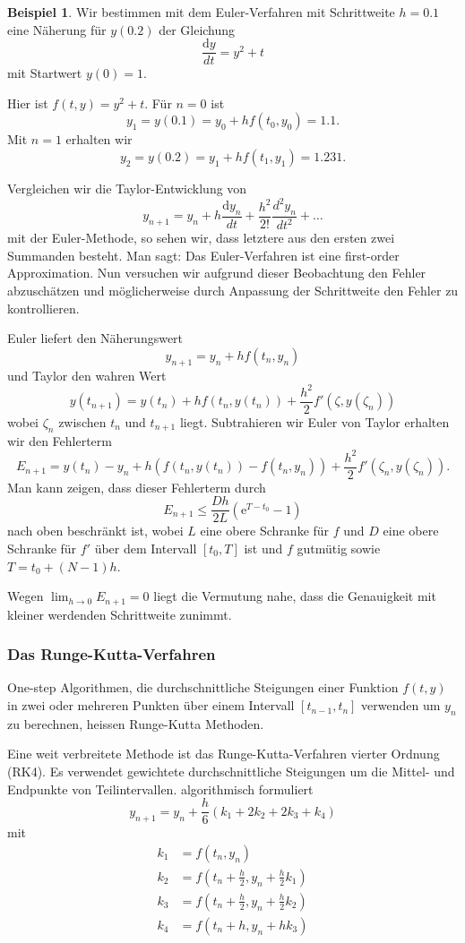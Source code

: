 \documentclass[%
11pt,%
twoside,%
titlepage,%
swissgerman,%
headsepline%
]{scrartcl}
\theoremstyle{definition}
\newtheorem{bsp}{Beispiel}[section] %
\theoremstyle{plain}
\begin{document}
\begin{bsp}
Wir bestimmen mit dem Euler-Verfahren mit Schrittweite $h=0.1$ eine Näherung für $y(0.2)$ der Gleichung
$$\frac{\mathrm{d}y}{dt}=y^2+t$$
mit Startwert $y(0)=1$.

Hier ist $f(t,y)=y^2+t$. Für $n=0$ ist
$$y_1=y(0.1)=y_0+hf(t_0,y_0)=1.1.$$
Mit $n=1$ erhalten wir
$$y_2=y(0.2)=y_1+hf(t_1,y_1)=1.231.$$
\end{bsp}

Vergleichen wir die Taylor-Entwicklung von
$$y_{n+1}=y_n+h\frac{\mathrm{d}y_n}{dt}+\frac{h^2}{2!}\frac{d^2y_n}{dt^2}+\dots$$
mit der Euler-Methode, so sehen wir, dass letztere aus den ersten zwei Summanden besteht. Man sagt: Das Euler-Verfahren ist eine first-order Approximation. Nun versuchen wir aufgrund dieser Beobachtung den Fehler abzuschätzen und möglicherweise durch Anpassung der Schrittweite den Fehler zu kontrollieren.

Euler liefert den Näherungswert
$$y_{n+1}=y_n+hf(t_n,y_n)$$
und Taylor den wahren Wert
$$y(t_{n+1})=y(t_n)+hf(t_n,y(t_n))+\frac{h^2}{2}f'(\zeta,y(\zeta_n))$$
wobei $\zeta_n$ zwischen $t_n$ und $t_{n+1}$ liegt. Subtrahieren wir Euler von Taylor erhalten wir den Fehlerterm
$$
E_{n+1}=y(t_n)-y_n+
h(f(t_n,y(t_n))-f(t_n,y_n))+\frac{h^2}{2}f'(\zeta_n,y(\zeta_n)).
$$
Man kann zeigen, dass dieser Fehlerterm durch
$$E_{n+1}\leq \frac{Dh}{2L}(\mathrm{e}^{T-t_0}-1)$$
nach oben beschränkt ist, wobei $L$ eine obere Schranke für $f$ und $D$ eine obere Schranke für $f'$ über dem Intervall $[t_0,T]$ ist und $f$ gutmütig sowie $T=t_0+(N-1)h$.

Wegen $\lim_{h\to0}E_{n+1}=0$ liegt die Vermutung nahe, dass die Genauigkeit mit kleiner werdenden Schrittweite zunimmt.

\subsubsection{Das Runge-Kutta-Verfahren}

One-step Algorithmen, die durchschnittliche Steigungen einer Funktion $f(t,y)$ in zwei oder mehreren Punkten über einem Intervall $[t_{n-1},t_n]$ verwenden um $y_n$ zu berechnen, heissen Runge-Kutta Methoden.

Eine weit verbreitete Methode ist das Runge-Kutta-Verfahren vierter Ordnung (RK4). Es verwendet gewichtete durchschnittliche Steigungen um die Mittel- und Endpunkte von Teilintervallen. algorithmisch formuliert
$$y_{n+1}=y_n+\frac{h}{6}(k_1+2k_2+2k_3+k_4)$$
mit
\begin{align*}
k_1 &= f(t_n,y_n)\\
k_2 &= f(t_n+\frac{h}{2},y_n+\frac{h}{2}k_1)\\
k_3 &= f(t_n+\frac{h}{2},y_n+\frac{h}{2}k_2)\\
k_4 &= f(t_n+h,y_n+hk_3)
\end{align*}
\end{document}

